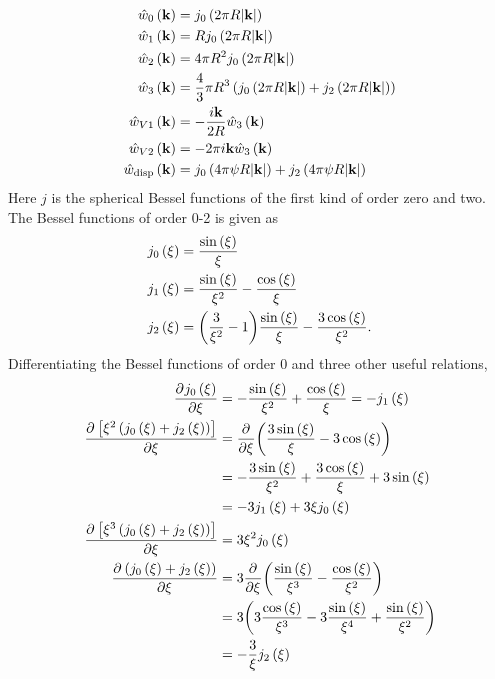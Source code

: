 \documentclass[12pt, letterpaper]{article}
\newcommand*{\pd}[3][]{\frac{\partial^{#1}#2}{\partial{#3}^{#1}}}%
\newcommand*{\lb}{\ensuremath{\left(}}
\newcommand*{\rb}{\ensuremath{\right)}}
\newcommand{\disp}{\ensuremath{\text{disp}}\xspace}
\begin{document}
\begin{align}
  \label{eq:weight_functions_fourier}
  \hat{w}_0 \lb \mathbf{k}\rb &= j_0\lb 2 \pi R |\mathbf{k}| \rb  \\
  \hat{w}_1 \lb \mathbf{k}\rb &= R j_0\lb 2 \pi R |\mathbf{k}| \rb  \\
  \hat{w}_2 \lb \mathbf{k}\rb &= 4 \pi R^2 j_0\lb 2 \pi R |\mathbf{k}| \rb  \\
  \hat{w}_3 \lb \mathbf{k}\rb &= \frac{4}{3} \pi R^3 \lb j_0\lb 2 \pi R |\mathbf{k}| \rb + j_2\lb 2 \pi R |\mathbf{k}| \rb \rb  \\
  \hat{w}_{V1} \lb \mathbf{k}\rb &= - \frac{i \mathbf{k}}{2 R} \hat{w}_3 \lb \mathbf{k}\rb  \\
  \hat{w}_{V2} \lb \mathbf{k}\rb &= - 2 \pi i \mathbf{k} \hat{w}_3 \lb \mathbf{k}\rb  \\
  \hat{w}_{\disp} \lb \mathbf{k}\rb &= j_0\lb 4 \pi \psi R |\mathbf{k}| \rb + j_2\lb 4 \pi \psi R |\mathbf{k}| \rb
\end{align}
Here $j$ is the spherical Bessel functions of the first kind of order
zero and two. The Bessel functions of order 0-2 is given as
\begin{align}
  \label{eq:bessel_functions}
  j_0\lb \xi \rb &= \frac{\sin \lb \xi \rb}{\xi} \\
  j_1\lb \xi \rb &= \frac{\sin \lb \xi \rb}{\xi^2} - \frac{\cos \lb \xi \rb}{\xi}  \\
  j_2\lb \xi \rb &= \biggl(\frac{3}{\xi^2} - 1\biggr) \frac{\sin \lb \xi \rb}{\xi} - \frac{3 \cos \lb \xi \rb}{\xi^2}.
\end{align}
Differentiating the Bessel functions of order 0 and three other useful relations,
\begin{align}
  \label{eq:bessel_function_differentials}
  \pd{j_0\lb \xi \rb}{\xi} &= -\frac{\sin \lb \xi \rb}{\xi^2} + \frac{\cos \lb \xi \rb}{\xi} = - j_1\lb \xi \rb\\
  \pd{\left[\xi^2\lb j_0\lb \xi \rb + j_2\lb \xi \rb\rb\right]}{\xi} &= \pd{}{\xi} \biggl(\frac{3\sin \lb \xi \rb}{\xi} - 3 \cos \lb \xi \rb\biggr) \nonumber \\
                           &= -\frac{3\sin \lb \xi \rb}{\xi^2} + \frac{3\cos \lb \xi \rb}{\xi} + 3 \sin \lb \xi \rb \nonumber \\
                           &= -3j_1\lb \xi \rb + 3 \xi j_0\lb \xi \rb\\
  \pd{\left[\xi^3\lb j_0\lb \xi \rb + j_2\lb \xi \rb\rb\right]}{\xi} &= 3 \xi^2 j_0\lb \xi \rb \\
  \pd{\lb j_0\lb \xi \rb + j_2\lb \xi \rb\rb}{\xi} &= 3\pd{}{\xi} \biggl(\frac{\sin \lb \xi \rb}{\xi^3} - \frac{\cos \lb \xi \rb}{\xi^2}\biggr) \nonumber \\
                           &= 3 \biggl(3\frac{\cos \lb \xi \rb}{\xi^3} - 3 \frac{\sin \lb \xi \rb}{\xi^4} + \frac{\sin \lb \xi \rb}{\xi^2}\biggr) \nonumber \\
                           &= -\frac{3}{\xi} j_2\lb \xi \rb
\end{align}
\end{document}
